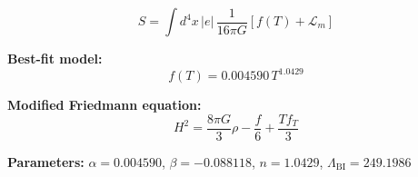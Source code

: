 
\begin{equation}
  S = \int d^4x \, |e| \, \frac{1}{16\pi G} \left[ f(T) + \mathcal{L}_m \right]
\end{equation}

\textbf{Best-fit model:}
\begin{equation}
  f(T) = 0.004590 \, T^{1.0429}
\end{equation}

\textbf{Modified Friedmann equation:}
\begin{equation}
  H^2 = \frac{8\pi G}{3} \rho - \frac{f}{6} + \frac{T f_T}{3}
\end{equation}

\textbf{Parameters:}
$\alpha = 0.004590$, \quad
$\beta = -0.088118$, \quad
$n = 1.0429$, \quad
$\Lambda_{\text{BI}} = 249.1986$